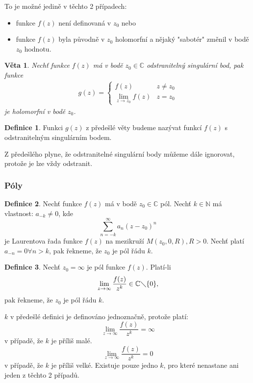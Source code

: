 \documentclass[a4]{report}
\newtheorem{theorem}{Věta}
\theoremstyle{definition}
\newtheorem{definition}{Definice}[section]
\begin{document}
To je možné jedině v těchto 2 případech:
\begin{itemize}
\item funkce $f(z)$ není definovaná v $z_0$ nebo
\item funkce $f(z)$ byla původně v $z_0$ holomorfní a nějaký "sabotér" změnil v bodě $z_0$ hodnotu.
\end{itemize}

\begin{theorem}
Nechť funkce $f(z)$ má v bodě $z_0\in\mathbb{C}$ odstranitelný singulární bod, pak funkce
\begin{align*}
g(z) = 
\begin{cases}
	f(z) & z \neq z_0 \\
    \lim_{z\rightarrow z_0}f(z) & z=z_0
\end{cases}
\end{align*}
je holomorfní v bodě $z_0$.
\end{theorem}

\begin{definition}
Funkci $g(z)$ z předešlé věty budeme nazývat funkcí $f(z)$ s odstranitelným singulárním bodem.
\end{definition}

Z předešlého plyne, že odstranitelné singulární body můžeme dále ignorovat, protože je lze vždy odstranit.

\subsubsection{Póly}
\begin{definition}
Nechť funkce $f(z)$ má v bodě $z_0\in\mathbb{C}$ pól. Nechť $k\in\mathbb{N}$ má vlastnost: $a_{-k}\neq 0$, kde $$\sum_{n=-k}^{\infty}a_n(z-z_0)^n$$ je Laurentova řada funkce $f(z)$ na mezikruží $M(z_0,0,R), R>0$. Nechť platí $a_{-n}=0 \forall n > k$, pak řekneme, že $z_0$ je pól řádu $k$.
\end{definition}

\begin{definition}
Nechť $z_0=\infty$ je pól funkce $f(z)$. Platí-li $$\lim_{z\rightarrow\infty}\frac{f(z)}{z^k}\in\mathbb{C}\diagdown\{0\},$$ pak řekneme, že $z_0$ je pól řádu $k$.
\end{definition}

$k$ v předešlé definici je definováno jednoznačně, protože platí: $$\lim_{z\rightarrow \infty}\frac{f(z)}{z^k}=\infty$$ v případě, že $k$ je příliš malé. $$\lim_{z\rightarrow \infty}\frac{f(z)}{z^k}=0$$ v případě, že $k$ je příliš velké. Existuje pouze jedno $k$, pro které nenastane ani jeden z těchto 2 případů.
\end{document}
